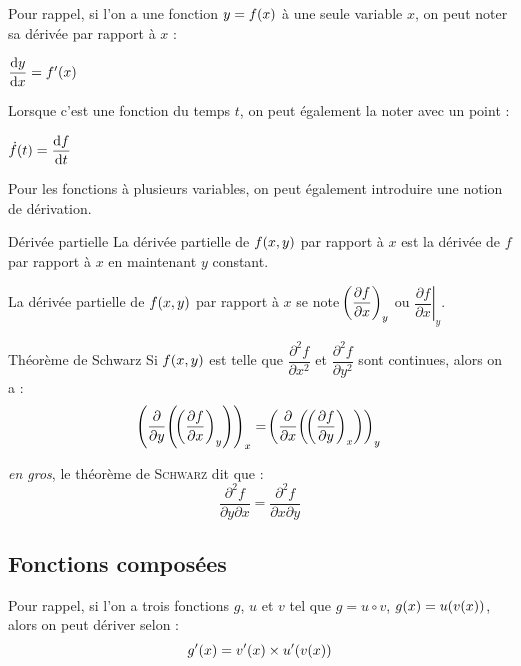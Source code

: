 \documentclass[a4paper,french,bookmarks]{book}
\begin{document}
    Pour rappel, si l'on a une fonction $y = f\!\left(x\right)$ à une seule variable $x$, on peut noter sa dérivée par rapport à $x$ :
    
    \begin{notation}
        $\dfrac{\mathrm d y}{\mathrm d x} = f'\!\left(x\right)$
    \end{notation}
    
    Lorsque c'est une fonction du temps $t$, on peut également la noter avec un point :
    
    \begin{notation}
        $\dot f\!\left(t\right) = \dfrac{\mathrm d f}{\mathrm d t}$
    \end{notation}
    
    Pour les fonctions à plusieurs variables, on peut également introduire une notion de dérivation.
    
    \begin{definition}{Dérivée partielle}
        La dérivée partielle de $f\!\left(x, y\right)$ par rapport à $x$ est la dérivée de $f$ par rapport à $x$ en maintenant $y$ constant.
    \end{definition}
    
    \begin{notation}
        La dérivée partielle de $f\!\left(x, y\right)$ par rapport à $x$ se note $\!\left(\dfrac{\partial f}{\partial x}\right)_y$ ou $\left.\dfrac{\partial f}{\partial x}\right\vert_y$.
    \end{notation}
    
    \begin{theorem}{Théorème de Schwarz}{}
        Si $f\!\left(x, y\right)$ est telle que $\dfrac{\partial^2 f}{\partial x^2}$ et $\dfrac{\partial^2 f}{\partial y^2}$ sont continues, alors on a :
        \[ \!\left(\dfrac{\partial}{\partial y}\!\left(\!\left(\dfrac{\partial f}{\partial x}\right)_y\right)\right)_x = \!\left(\dfrac{\partial}{\partial x}\!\left(\!\left(\dfrac{\partial f}{\partial y}\right)_x\right)\right)_y \]
    \end{theorem}
    
    \textit{en gros}, le théorème de \textsc{Schwarz} dit que :
    \[ \dfrac{\partial^2 f}{\partial y \partial x} = \dfrac{\partial^2 f}{\partial x \partial y}\]
    
    \subsection{Fonctions composées}
    
    Pour rappel, si l'on a trois fonctions $g$, $u$ et $v$ tel que $g = u \circ v$, \ie $g\!\left(x\right) = u\!\left(v\!\left(x\right)\right)$, alors on peut dériver selon :
    \[ g'\!\left(x\right) = v'\!\left(x\right) \times u'\!\left(v\!\left(x\right)\right)\]
    
\end{document}
